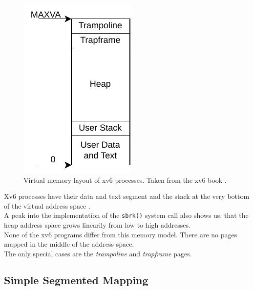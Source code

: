 \begin{figure}[t!]
    \centering
    \includegraphics[scale=.5]{figures/prog_vm.pdf}
    \caption[xv6 memory layout]{Virtual memory layout of xv6 processes. Taken from the xv6 book \cite{cox2011xv6}.}
    \label{impl:proclayout}
\end{figure}

Xv6 processes have their data and text segment and the stack at the very bottom of the virtual
address space \cite{cox2011xv6}.\\
A peak into the implementation of the \texttt{sbrk()} system call also shows us, that the heap
address space grows linearily from low to high addresses.\\
None of the xv6 programs differ from this memory model. There are no pages mapped in the
middle of the address space.\\
The only special cases are the \textit{trampoline} and \textit{trapframe} pages.

\subsection{Simple Segmented Mapping}

